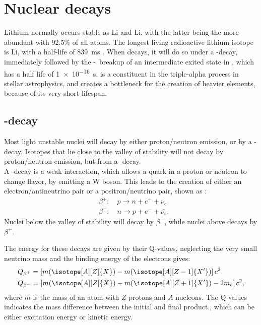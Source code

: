 \section{Nuclear decays}
Lithium normally occurs stable as \isotope[6]Li and \isotope[7]Li, with the latter being the more abundant with 92.5\% of all atoms. The longest living radioactive lithium isotope is \isotope[8]Li, with a half-life of \SI{839}{ms} . 
When \li decays, it will do so under a  \be-decay, immediately followed by the \al-\al\ breakup of an intermediate exited state in \ber, which has a half life of \SI{1e-16}{s}. \ber is a constituent in the triple-alpha process in stellar astrophysics, and creates a bottleneck for the creation of heavier elements, because of its very short lifespan.


\subsection{\be-decay}
Most light unstable nuclei will decay by either proton/neutron emission, or by a \be-decay. Isotopes that lie close to the valley of stability will not decay by proton/neutron emission, but from a \be-decay.
\\
A \be-decay is a weak interaction, which allows a quark in a proton or neutron to change flavor, by emitting a W boson. This leads to the creation of either an electron/antineutrino pair or a positron/neutrino pair, shown as :
\begin{align}
&\beta^+:\quad p\rightarrow n + e^+ + \nu_e\\
&\beta^-:\quad n\rightarrow p + e^- + \bar{\nu_e}.
\end{align}
Nuclei below the valley of stability will decay by $\beta^-$, while nuclei above decays by $\beta ^+$.

The energy for  these decays are given by their Q-values, neglecting the very small neutrino mass and the binding energy of the electrons gives:
\begin{align}
&Q_{\beta^+} = \left[ m (\isotope[A][Z]{X}) - m(\isotope[A][Z-1]{X'})  		 \right] c^2\\
&Q_{\beta^-} = \left[ m (\isotope[A][Z]{X}) - m(\isotope[A][Z+1]{X'}) -2m_e  \right] c^2,
\end{align}
where $m$ is the mass of an atom with $Z$ protons and $A$ nucleons.
The Q-values indicates the mass difference between the initial and final product., which can be either excitation energy or kinetic energy. 

